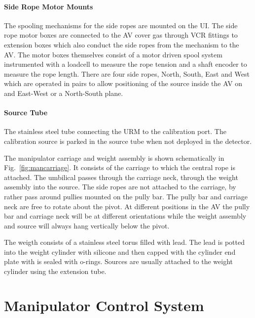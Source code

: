 \paragraph{Side Rope Motor Mounts}
The spooling mechanisms for the side ropes are mounted on the UI. The
side rope motor boxes are connected to the AV cover gas through VCR
fittings to extension boxes which also conduct the side ropes from the
mechanism to the AV. The motor boxes themselves consist of a motor
driven spool system instrumented with a loadcell to measure the rope
tension and a shaft encoder to measure the rope length. There are four
side ropes, North, South, East and West which are operated in pairs to
allow positioning of the source inside the AV on and East-West or a
North-South plane.

\paragraph{Source Tube}
The stainless steel tube connecting the URM to the calibration
port. The calibration source is parked in the source tube when not
deployed in the detector.

The manipulator carriage and weight assembly is shown schematically in
Fig.~\ref{fig:mancarriage}. It consists of the carriage to which the
central rope is attached. The umbilical passes through the carriage
neck, through the weight assembly into the source. The side ropes are
not attached to the carriage, by rather pass around pullies mounted on
the pully bar. The pully bar and carriage neck are free to rotate
about the pivot. At different positions in the AV the pully bar and
carriage neck will be at different orientations while the weight
assembly and source will always hang vertically below the pivot.

The weigth consists of a stainless steel torus filled with lead. The
lead is potted into the weight cylinder with silicone and then capped
with the cylinder end plate with is sealed with o-rings. Sources are
usually attached to the weight cylinder using the extension tube.

\section{Manipulator Control System}

